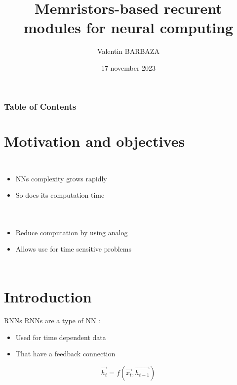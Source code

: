 \documentclass[14pt]{beamer}
\title{Memristors-based recurent modules for neural computing}
\subtitle{}
\author[V. BARBAZA]{{Valentin BARBAZA}}
\date{17 november 2023}
\begin{document}
\frame{\titlepage}

\begin{frame}
  \frametitle{Table of Contents}
  \tableofcontents
\end{frame}

\section{Motivation and objectives}

\begin{frame}{\insertsection}
  \begin{columns}
    \begin{itemize}
      \item NNs complexity grows rapidly
      \item So does its computation time
    \end{itemize}
    
  \end{columns}
\end{frame}

\begin{frame}{\insertsection}
  \begin{columns}
    \begin{itemize}
      \item Reduce computation by using analog
      \item Allows use for time sensitive problems
    \end{itemize}
    
  \end{columns}
\end{frame}

\section{Introduction}

\begin{frame}{\insertsection}{RNNs}
  RNNs are a type of NN :
  \begin{itemize}
    \item Used for time dependent data
    \item That have a feedback connection
  \end{itemize}

  \begin{equation}\label{eq:rnn}
    \overrightarrow{h_t}=f(\overrightarrow{x_t},\overrightarrow{h_{t-1}})
  \end{equation}
\end{frame}
\end{document}
